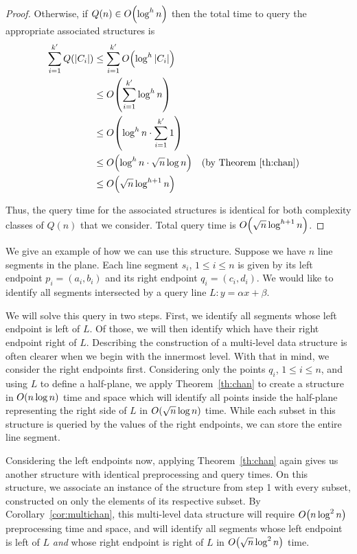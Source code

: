 \begin{proof}
\noindent Otherwise, if $Q(n) \in O\!\left(\log^h{n}\right)$ then the total time to query the appropriate associated structures is
\begin{align*}
\sum_{i=1}^{k'}{Q(|C_i|)}
&\leq \sum_{i=1}^{k'}{\BigOh{\log^h{|C_i|}}} \\
%
&\leq \BigOh{\sum_{i=1}^{k'}{\log^h{n}}} \\
%
&\leq \BigOh{\log^h{n} \cdot \sum_{i=1}^{k'}{1}} \\
%
&\leq \BigOh{\log^h{n} \cdot \sqrt{n}\log{n}} && \text{(by Theorem \ref{th:chan})}\\
%
&\leq \BigOh{\sqrt{n}\log^{h+1}{n}} \\
\end{align*}

\noindent Thus, the query time for the associated structures is identical for both complexity classes of $Q(n)$ that we consider. 
Total query time is $O\!\left(\sqrt{n}\log^{h+1}{n}\right)$.
\end{proof}

We give an example of how we can use this structure. 
Suppose we have $n$ line segments in the plane.
Each line segment $s_i$, $1 \leq i \leq n$ is given by its left endpoint $p_i = (a_i, b_i)$ and its right endpoint $q_i = (c_i, d_i)$.
We would like to identify all segments intersected by a query line $L: y = \alpha x + \beta$.

We will solve this query in two steps.
First, we identify all segments whose left endpoint is left of $L$.
Of those, we will then identify which have their right endpoint right of $L$.
Describing the construction of a multi-level data structure is often clearer when we begin with the innermost level.
With that in mind, we consider the right endpoints first. 
Considering only the points $q_i$, $1 \leq i \leq n$, and using $L$ to define a half-plane, we apply 
Theorem~\ref{th:chan} to create a structure in $O\!\left(n\log{n}\right)$ time and space which will identify all points inside the half-plane representing the right side of $L$ in $O\!\left(\sqrt{n}\log{n}\right)$ time.  
While each subset in this structure is queried by the values of the right endpoints, we can store the entire line segment.

Considering the left endpoints now, applying Theorem~\ref{th:chan} again gives us another structure with identical preprocessing and query times. 
On this structure, we associate an instance of the structure from step 1 with every subset, constructed on only the elements of its respective subset.
By Corollary~\ref{cor:multichan}, this multi-level data structure will require $O\!\left(n\log^2{n}\right)$ preprocessing time and space, and will identify all segments whose left endpoint is left of $L$ \emph{and} whose right endpoint is right of $L$ in $O\!\left(\sqrt{n}\log^2{n}\right)$ time.
